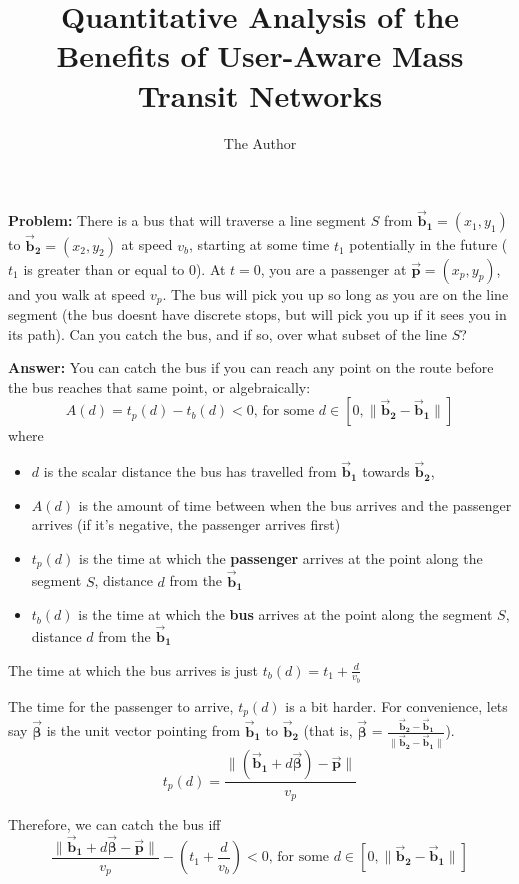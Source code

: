 \documentclass[11pt]{article} %
\title{Quantitative Analysis of the Benefits of User-Aware Mass Transit Networks}
\author{The Author}
\date{}
\begin{document}
\maketitle

\textbf{Problem: }There is a bus that will traverse a line segment $S$ from $\bm{\vec{b}_1} = (x_1, y_1)$ to  $\bm{\vec{b}_2} = (x_2, y_2)$ at speed $v_b$, starting at some time $t_1$ potentially in the future ($t_1$ is greater than or equal to 0). At $t=0$, you are a passenger at $\bm{\vec{p}} = (x_p, y_p)$, and you walk at speed $v_p$. The bus will pick you up so long as you are on the line segment (the bus doesnt have discrete stops, but will pick you up if it sees you in its path). Can you catch the bus, and if so, over what subset of the line $S$?

\vspace{0.5cm}
\noindent \textbf{Answer: } You can catch the bus if you can reach any point on the route before the bus reaches that same point, or algebraically:
$$A(d) =  t_p(d) - t_b(d) < 0 \mbox{, for some } d \in [0,  \|\bm{\vec{b}_2} - \bm{\vec{b}_1}\|] $$
where 
\begin{itemize}
\item $d$ is the scalar distance the bus has travelled from $\bm{\vec{b}_1}$ towards $\bm{\vec{b}_2}$,
\item $A(d)$ is the amount of time between when the bus arrives and the passenger arrives (if it's negative, the passenger arrives first)
\item $t_p(d)$ is the time at which the \textbf{passenger} arrives at the point along the segment $S$, distance $d$ from the $\bm{\vec{b}_1}$
\item $t_b(d)$ is the time at which the \textbf{bus} arrives at the point along the segment $S$, distance $d$ from the $\bm{\vec{b}_1}$
\end{itemize}

The time at which the bus arrives is just $t_b(d) = t_1 + \frac{d}{v_b}$

The time for the passenger to arrive, $t_p(d)$ is a bit harder. 
For convenience, lets say  $\bm{\vec{\beta}}$ is the unit vector pointing from $\bm{\vec{b}_1}$ to $\bm{\vec{b}_2}$ (that is,  $\bm{\vec{\beta}}$ = $\frac{\bm{\vec{b}_2} - \bm{\vec{b}_1}}{\|\bm{\vec{b}_2} - \bm{\vec{b}_1}\|}$).
$$ t_p(d) = \frac{ \| (\bm{\vec{b}_1} + d\bm{\vec{\beta}}) - \bm{\vec{p}} \|} {v_p} $$

Therefore, we can catch the bus iff
$$ \frac{ \| \bm{\vec{b}_1} + d\bm{\vec{\beta}} - \bm{\vec{p}} \|} {v_p} - \left(t_1 + \frac{d}{v_b}\right) < 0 \mbox{, for some } d \in [0,  \|\bm{\vec{b}_2} - \bm{\vec{b}_1}\|] $$
\end{document}
